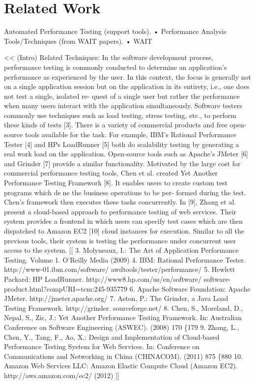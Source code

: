\documentclass[runningheads,a4paper]{llncs}
\begin{document}

\section{Related Work}

Automated Performance Testing (support tools).
•	Performance Analysis Tools/Techniques (from WAIT papers).
•	WAIT

<<
(Intro) Related Techniques: In the software development process, performance testing is 
commonly conducted to determine an application's performance as experienced by the user.
In this context, the focus is generally not on a single application session but
on the application in its entirety, i.e., one does not test a single, isolated re-
quest of a single user but rather the performance when many users interact with
the application simultaneously. Software testers commonly use techniques such
as load testing, stress testing, etc., to perform these kinds of tests [3]. There
is a variety of commercial products and free open-source tools available for the
task. For example, IBM's Rational Performance Tester [4] and HPs LoadRunner
[5] both do scalability testing by generating a real work load on the application.
Open-source tools such as Apache's JMeter [6] and Grinder [7] provide a similar
functionality.
Motivated by the large cost for commercial performance testing tools, Chen
et al. created Yet Another Performance Testing Framework [8]. It enables users
to create custom test programs which dene the business operations to be per-
formed during the test. Chen's framework then executes these tasks concurrently.
In [9], Zhang et al. present a cloud-based approach to performance testing of web
services. Their system provides a frontend in which users can specify test cases
which are then dispatched to Amazon EC2 [10] cloud instances for execution.
Similar to all the previous tools, their system is testing the performance under
concurrent user access to the system.
[[
3. Molyneaux, I.: The Art of Application Performance Testing. Volume 1. O'Reilly
Media (2009)
4. IBM: Rational Performance Tester. http://www-01.ibm.com/software/
awdtools/tester/performance/
5. Hewlett Packard: HP LoadRunner. http://www8.hp.com/us/en/software/
software-product.html?compURI=tcm:245-935779
6. Apache Software Foundation: Apache JMeter. http://jmeter.apache.org/
7. Aston, P.: The Grinder, a Java Load Testing Framework. http://grinder.
sourceforge.net/
8. Chen, S., Moreland, D., Nepal, S., Zic, J.: Yet Another Performance Testing
Framework. In: Australian Conference on Software Engineering (ASWEC). (2008)
170 \{179
9. Zhang, L., Chen, Y., Tang, F., Ao, X.: Design and Implementation of Cloud-based
Performance Testing System for Web Services. In: Conference on Communications
and Networking in China (CHINACOM). (2011) 875 \{880
10. Amazon Web Services LLC: Amazon Elastic Compute Cloud (Amazon EC2).
http://aws.amazon.com/ec2/ (2012)
]]
\end{document}
